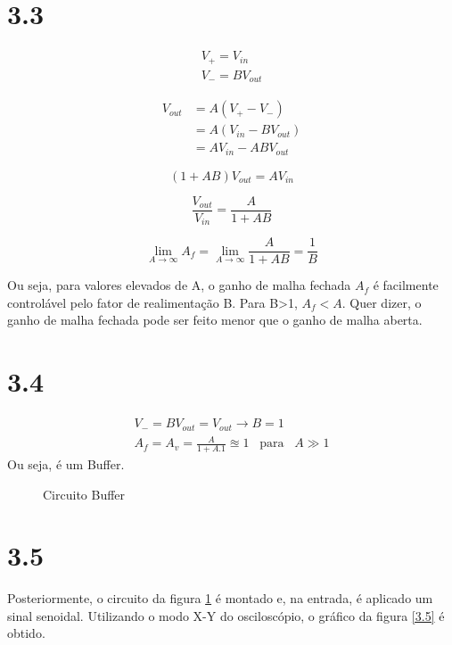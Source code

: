 \documentclass[brazil]{article}
\begin{document}
\newpage
\section*{3.3}

\begin{eqnarray*}
V_+=V_{in}\\
V_-=BV_{out}
 \end{eqnarray*}

\vspace{-8mm}

\begin{align*}
V_{out}& =  A(V_+-V_-) \\
&=A(V_{in}-BV_{out})\\
&=AV_{in}-ABV_{out}
\end{align*}

\vspace{-5mm}
\[
(1+AB)V_{out}=AV_{in}
\]


\begin{equation}
\frac{V_{out}}{V_{in}}=\frac{A}{1+AB}
\label{Ganho de malha fechada A_f}
\end{equation}

\begin{equation}
\lim_{A \to \infty}A_f=\lim_{A \to \infty}\frac{A}{1+AB}=\frac{1}{B}
\end{equation}

Ou seja, para valores elevados de A, o ganho de malha fechada $A_f$ é facilmente controlável pelo fator de realimentação B. Para B>1, $A_f<A$. Quer dizer, o ganho de malha fechada pode ser feito menor que o ganho de malha aberta. 



\section*{3.4}

\begin{eqnarray*}
V_-=BV_{out}=V_{out}\rightarrow B=1\\
A_f=A_{v}=\frac{A}{1+A.1} \approxeq 1\;\;\; \text{para}\;\;\;A\gg1
 \end{eqnarray*}
Ou seja, é um Buffer.


\begin{figure}[h!]
\centerline{}
\caption{Circuito Buffer \label{circ:3}}
\end{figure}


\section*{3.5}
 Posteriormente, o circuito da figura \ref{circ:3} é montado e, na entrada, é aplicado um sinal senoidal. Utilizando o modo X-Y do osciloscópio, o gráfico da figura \ref{3.5} é obtido.
\end{document}

